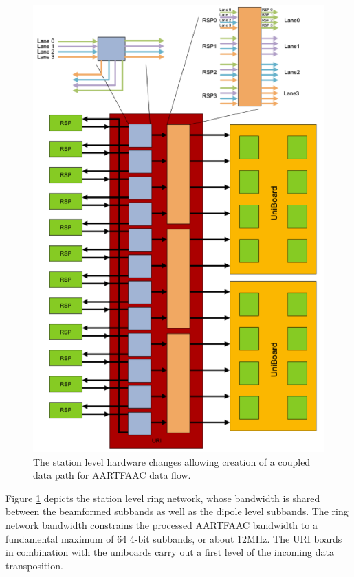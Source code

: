 \documentclass{aa}
\begin{document}
\begin{figure}[htbp]
\centering
\includegraphics[width=1\textwidth]{Figs/station_hw_proc_afaac.png}
\caption{The station level hardware changes  allowing creation of a coupled data
  path for AARTFAAC data flow.}
\label{fig:afaac_station_hw}
\end{figure}

Figure \ref{fig:afaac_station_hw} depicts the  station level ring network, whose
bandwidth is shared between the beamformed  subbands as well as the dipole level
subbands. The ring network bandwidth constrains the processed AARTFAAC bandwidth
to a fundamental maximum of 64 4-bit subbands, or about 12MHz. The URI boards in
combination with  the uniboards  carry out  a first level  of the  incoming data
transposition.
\end{document}
